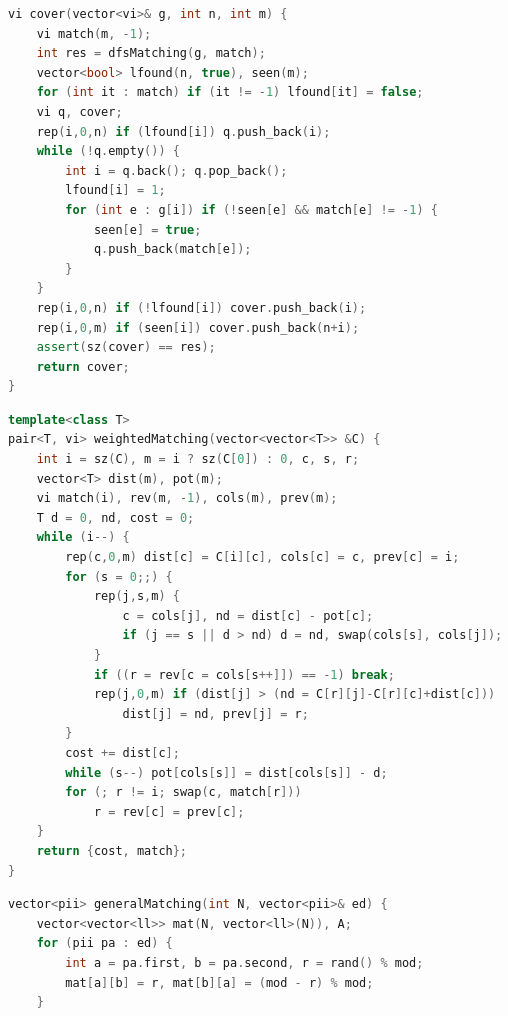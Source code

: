 \begin{multicols}{\Columns}
\begin{lstlisting}[language=C++]
vi cover(vector<vi>& g, int n, int m) {
	vi match(m, -1);
	int res = dfsMatching(g, match);
	vector<bool> lfound(n, true), seen(m);
	for (int it : match) if (it != -1) lfound[it] = false;
	vi q, cover;
	rep(i,0,n) if (lfound[i]) q.push_back(i);
	while (!q.empty()) {
		int i = q.back(); q.pop_back();
		lfound[i] = 1;
		for (int e : g[i]) if (!seen[e] && match[e] != -1) {
			seen[e] = true;
			q.push_back(match[e]);
		}
	}
	rep(i,0,n) if (!lfound[i]) cover.push_back(i);
	rep(i,0,m) if (seen[i]) cover.push_back(n+i);
	assert(sz(cover) == res);
	return cover;
}
\end{lstlisting}

\begin{lstlisting}[language=C++]
template<class T>
pair<T, vi> weightedMatching(vector<vector<T>> &C) {
	int i = sz(C), m = i ? sz(C[0]) : 0, c, s, r;
	vector<T> dist(m), pot(m);
	vi match(i), rev(m, -1), cols(m), prev(m);
	T d = 0, nd, cost = 0;
	while (i--) {
		rep(c,0,m) dist[c] = C[i][c], cols[c] = c, prev[c] = i;
		for (s = 0;;) {
			rep(j,s,m) {
				c = cols[j], nd = dist[c] - pot[c];
				if (j == s || d > nd) d = nd, swap(cols[s], cols[j]);
			}
			if ((r = rev[c = cols[s++]]) == -1) break;
			rep(j,0,m) if (dist[j] > (nd = C[r][j]-C[r][c]+dist[c]))
				dist[j] = nd, prev[j] = r;
		}
		cost += dist[c];
		while (s--) pot[cols[s]] = dist[cols[s]] - d;
		for (; r != i; swap(c, match[r]))
			r = rev[c] = prev[c];
	}
	return {cost, match};
}
\end{lstlisting}

\begin{lstlisting}[language=C++]
vector<pii> generalMatching(int N, vector<pii>& ed) {
	vector<vector<ll>> mat(N, vector<ll>(N)), A;
	for (pii pa : ed) {
		int a = pa.first, b = pa.second, r = rand() % mod;
		mat[a][b] = r, mat[b][a] = (mod - r) % mod;
	}


\end{lstlisting}
\end{multicols}
